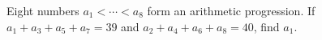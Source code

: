 Eight numbers $a_1<\cdots<a_8$ form an arithmetic progression. If $a_1+a_3+a_5+a_7=39$ and $a_2+a_4+a_6+a_8=40$, find $a_1$.
